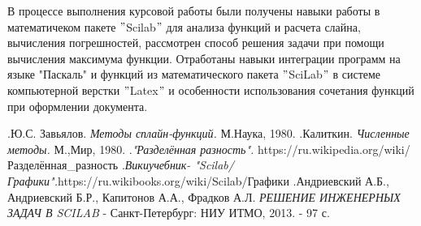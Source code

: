 \documentclass[russian,utf8,nocolumnxxxi,nocolumnxxxii]{eskdtext}
\begin{document}
В процессе выполнения курсовой работы были получены навыки работы в математичеком пакете $"$Scilab$"$ для анализа функций и расчета слайна, вычисления погрешностей, рассмотрен способ решения задачи при помощи вычисления максимума функции. Отработаны навыки интеграции программ на языке "Паскаль" и функций из математического пакета $"$SciLab$"$ в системе компьютерной верстки $"$Latex$"$ и особенности использования сочетания функций при оформлении документа.
\begin{thebibliography}{}
    \bibitem .Ю.С. Завьялов. \textit{Методы сплайн-функций.} М.Наука, 1980.
    \bibitem .Калиткин. \textit{Численные методы.} М.,Мир, 1980.
    \bibitem  .\textit{"Разделённая разность".} https://ru.wikipedia.org/wiki/Разделённая\_разность
    \bibitem .\textit{Викиучебник- "Scilab/Графики".}https://ru.wikibooks.org/wiki/Scilab/Графики
    \bibitem .Андриевский А.Б., Андриевский Б.Р., Капитонов А.А., Фрадков А.Л. \textit{РЕШЕНИЕ ИНЖЕНЕРНЫХ ЗАДАЧ В SCILAB} - Санкт-Петербург: НИУ ИТМО, 2013. - 97 с.
    \end{thebibliography}
\end{document}
